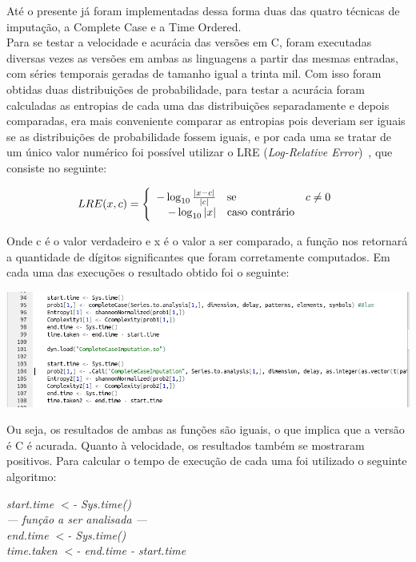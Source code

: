 \documentclass{article}
\begin{document}
Até o presente já foram implementadas dessa forma duas das quatro técnicas de imputação, a Complete Case e a Time Ordered. \\
Para se testar a velocidade e acurácia das versões em C, foram executadas diversas vezes as versões em ambas as linguagens a partir das mesmas entradas, com séries temporais geradas de tamanho igual a trinta mil. Com isso foram obtidas duas distribuições de probabilidade, para testar a acurácia foram calculadas as entropias de cada uma das distribuições separadamente e depois comparadas, era mais conveniente comparar as entropias pois deveriam ser iguais se as distribuições de probabilidade fossem iguais, e por cada uma se tratar de um único valor numérico foi possível utilizar o LRE (\textit{Log-Relative Error})~\cite{almiron2010numerical}, que consiste no seguinte:

$$ LRE(x,c)
= \left\{\begin{array}{rll}
- \log_{10} \frac{|x-c|}{|c|} & \hbox{se} & c \neq 0 \\
- \log_{10} |x| & \hbox{caso contrário}
\end{array}\right.$$

Onde c é o valor verdadeiro e x é o valor a ser comparado, a função nos retornará a quantidade de dígitos significantes que foram corretamente computados. Em cada uma das execuções o resultado obtido foi o seguinte:

    
\includegraphics[width=0.80\columnwidth]{LRE.png}


Ou seja, os resultados de ambas as funções são iguais, o que implica que a versão é C é acurada.
Quanto à velocidade, os resultados também se mostraram positivos. Para calcular o tempo de execução de cada uma foi utilizado o seguinte algoritmo:
    
\begin{flushleft}
\textit{start.time $<$- Sys.time()\\
--- função a ser analisada ---\\
end.time $<$- Sys.time()\\
time.taken $<$- end.time - start.time\\}
\end{flushleft}
\end{document}
